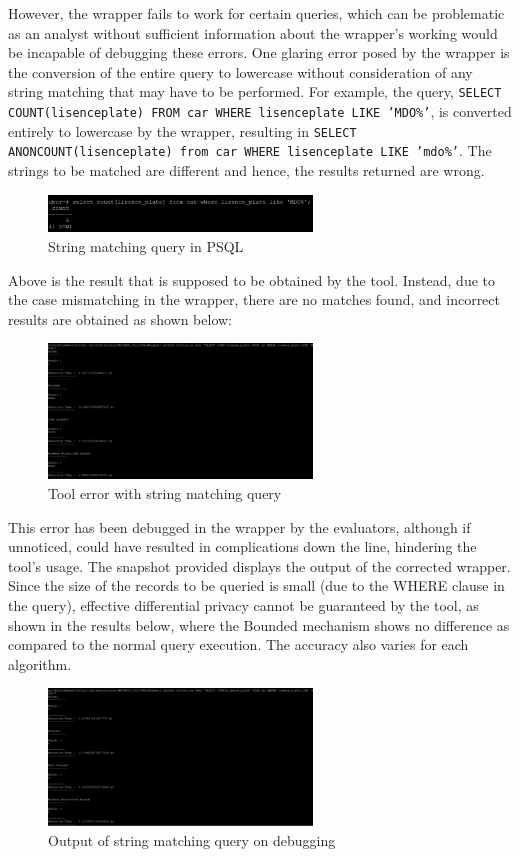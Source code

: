 \documentclass[acmsmall]{acmart}
\begin{document}
However, the wrapper fails to work for certain queries, which can be problematic as an analyst without sufficient information about the wrapper’s working would be incapable of debugging these errors. One glaring error posed by the wrapper is the conversion of the entire query to lowercase without consideration of any string matching that may have to be performed. For example, the query, \texttt{SELECT COUNT(lisence\textunderscore plate) FROM car WHERE lisence\textunderscore plate LIKE 'MDO\%'}, is converted entirely to lowercase by the wrapper, resulting in \texttt{SELECT ANON\textunderscore COUNT(lisence\textunderscore plate) from car WHERE lisence\textunderscore plate LIKE 'mdo\%'}. The strings to be matched are different and hence, the results returned are wrong.
\begin{figure}[htp]
    \centering
    \includegraphics[width=7cm]{Fig 4.3.4.png}
    \caption{String matching query in PSQL}
    \label{fig:4.3.4}
\end{figure}

Above is the result that is supposed to be obtained by the tool. Instead, due to the case mismatching in the wrapper, there are no matches found, and incorrect results are obtained as shown below:
\begin{figure}[htp]
    \centering
    \includegraphics[width=7cm]{Fig 4.3.5.png}
    \caption{Tool error with string matching query}
    \label{fig:4.3.5}
\end{figure}

This error has been debugged in the wrapper by the evaluators, although if unnoticed, could have resulted in complications down the line, hindering the tool’s usage. The snapshot provided displays the output of the corrected wrapper. Since the size of the records to be queried is small (due to the WHERE clause in the query), effective differential privacy cannot be guaranteed by the tool, as shown in the results below, where the Bounded mechanism shows no difference as compared to the normal query execution. The accuracy also varies for each algorithm.
\begin{figure}[htp]
    \centering
    \includegraphics[width=7cm]{Fig 4.3.6.png}
    \caption{Output of string matching query on debugging}
    \label{Fig:4.3.6}
\end{figure}
\end{document}
